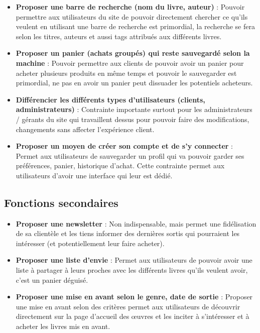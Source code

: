 \documentclass[14pt]{extarticle}
\begin{document}
\begin{itemize}
    \item \textbf{Proposer une barre de recherche (nom du livre, auteur)} : Pouvoir permettre aux utilisateurs du site de pouvoir directement chercher ce qu'ils veulent en utilisant une barre de recherche est primordial, la recherche se fera selon les titres, auteurs et aussi tags attribués aux différents livres.
    
    \item \textbf{Proposer un panier (achats groupés) qui reste sauvegardé selon la machine} : Pouvoir permettre aux clients de pouvoir avoir un panier pour acheter plusieurs produits en même temps et pouvoir le sauvegarder est primordial, ne pas en avoir un panier peut dissuader les potentiels acheteurs.
    
    \item \textbf{Différencier les différents types d'utilisateurs (clients, administrateurs)} : Contrainte importante surtout pour les administrateurs / gérants du site qui travaillent dessus pour pouvoir faire des modifications, changements sans affecter l'expérience client.
    
    \item \textbf{Proposer un moyen de créer son compte et de s'y connecter} : Permet aux utilisateurs de sauvegarder un profil qui va pouvoir garder ses préférences, panier, historique d'achat. Cette contrainte permet aux utilisateurs d'avoir une interface qui leur est dédié.
\end{itemize}

\subsection{Fonctions secondaires}
\begin{itemize}
    \item \textbf{Proposer une newsletter} : Non indispensable, mais permet une fidélisation de sa clientèle et les tiens informer des dernières sortis qui pourraient les intéresser (et potentiellement leur faire acheter).
    
    \item \textbf{Proposer une liste d'envie} : Permet aux utilisateurs de pouvoir avoir une liste à partager à leurs proches avec les différents livres qu'ils veulent avoir, c'est un panier déguisé.
    
    \item \textbf{Proposer une mise en avant selon le genre, date de sortie} : Proposer une mise en avant selon des critères  permet aux utilisateurs de découvrir directement sur la page d'accueil des œuvres et les inciter à s'intéresser et à acheter les livres mis en avant.
\end{itemize}
\end{document}
